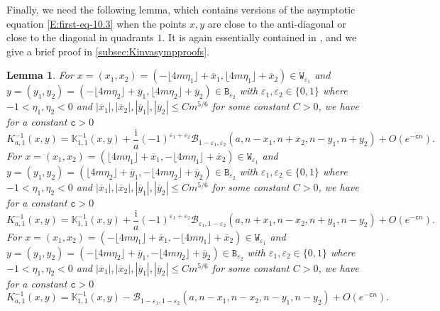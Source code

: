 \documentclass[11pt,twoside]{amsart}
\theoremstyle{plain}
\newtheorem{lem}[thm]{Lemma}
\numberwithin{quest}{section}
\theoremstyle{remark}
\numberwithin{rem}{section}
\theoremstyle{definition}
\newcommand{\eps}{\varepsilon}
\begin{document}
	
	Finally, we need the following lemma, which contains versions of the asymptotic equation \eqref{E:first-eq-10.3} when the points $x, y$ are close to the anti-diagonal or close to the diagonal in quadrants $1$. It is again essentially contained in \cite{CJ16}, and we give a brief proof in \cref{subsec:Kinvasympproofs}.
	
	\begin{lem}\label{L:Kinv:rotationestimate}
		For $x=(x_1,x_2)=(-\lfloor 4m\eta_1 \rfloor +\overline{x}_1, \lfloor 4m\eta_1 \rfloor +\overline{x}_2)\in \mathtt{W}_{\eps_1}$ and $y=(y_1,y_2)=(- \lfloor 4m\eta_2 \rfloor +\overline{y}_1, \lfloor 4m\eta_2 \rfloor +\overline{y}_2)\in \mathtt{B}_{\eps_2}$ with $\eps_1,\eps_2 \in\{0,1\}$ where $-1<\eta_1,\eta_2<0$ and $|\overline{x}_1|,|\overline{x}_2|,|\overline{y}_1|,|\overline{y}_2| \le C m^{5/6}$ for some constant $C>0$, we have for a constant $\mathtt{c}>0$
		\begin{equation*}
			K^{-1}_{a,1}(x,y)=\mathbb{K}^{-1}_{1,1}(x,y)+\frac{\mathrm{i}}{a}(-1)^{\eps_1+\eps_2}\mathcal{B}_{1-\eps_1,\eps_2}(a,n-x_1,n+x_2,n-y_1,n+y_2)+O(e^{-\mathtt{c}n}).
		\end{equation*}
		For $x=(x_1,x_2)=(\lfloor 4m\eta_1 \rfloor +\overline{x}_1,- \lfloor 4m\eta_1 \rfloor +\overline{x}_2)\in \mathtt{W}_{\eps_1}$ and $y=(y_1,y_2)=( \lfloor 4m\eta_2 \rfloor +\overline{y}_1,- \lfloor 4m\eta_2 \rfloor +\overline{y}_2)\in \mathtt{B}_{\eps_2}$ with $\eps_1,\eps_2 \in\{0,1\}$ where $-1<\eta_1,\eta_2<0$ and $|\overline{x}_1|,|\overline{x}_2|,|\overline{y}_1|,|\overline{y}_2|\leq Cm^{5/6}$ for some constant $C>0$, we have for a constant $\mathtt{c}>0$
		\begin{equation*}
			K^{-1}_{a,1}(x,y)=\mathbb{K}^{-1}_{1,1}(x,y)+\frac{\mathrm{i}}{a}(-1)^{\eps_1+\eps_2}\mathcal{B}_{\eps_1,1-\eps_2}(a,n+x_1,n-x_2,n+y_1,n-y_2)+O(e^{-\mathtt{c}n}).
		\end{equation*}
		For $x=(x_1,x_2)=(-\lfloor 4m\eta_1 \rfloor +\overline{x}_1,- \lfloor 4m\eta_1 \rfloor +\overline{x}_2)\in \mathtt{W}_{\eps_1}$ and $y=(y_1,y_2)=(-\lfloor 4m\eta_2 \rfloor +\overline{y}_1,- \lfloor 4m\eta_2 \rfloor +\overline{y}_2)\in \mathtt{B}_{\eps_2}$ with $\eps_1,\eps_2 \in\{0,1\}$ where $-1<\eta_1,\eta_2<0$ and $|\overline{x}_1|,|\overline{x}_2|,|\overline{y}_1|,|\overline{y}_2|\leq Cm^{5/6}$ for some constant $C>0$, we have for a constant $\mathtt{c}>0$
		\begin{equation*}
			K^{-1}_{a,1}(x,y)=\mathbb{K}^{-1}_{1,1}(x,y)-\mathcal{B}_{1-\eps_1,1-\eps_2}(a,n-x_1,n-x_2,n-y_1,n-y_2)+O(e^{-\mathtt{c}n}).
		\end{equation*}
	\end{lem}
	
\end{document}
